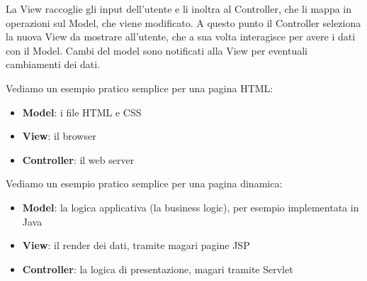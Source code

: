 \documentclass[a4paper,12pt, oneside]{book}
\begin{document}
La View raccoglie gli input dell'utente e li inoltra al Controller, che li mappa
in operazioni sul Model, che viene modificato. A questo punto il Controller
seleziona la nuova View da mostrare all'utente, che a sua volta interagisce per
avere i dati con il Model. Cambi del model sono notificati alla View per
eventuali cambiamenti dei dati.
\begin{esempio}
  Vediamo un esempio pratico semplice per una pagina HTML:
  \begin{itemize}
    \item \textbf{Model}: i file HTML e CSS
    \item \textbf{View}: il browser
    \item \textbf{Controller}: il web server
  \end{itemize}
\end{esempio}
\begin{esempio}
  Vediamo un esempio pratico semplice per una pagina dinamica:
  \begin{itemize}
    \item \textbf{Model}: la logica applicativa (la business logic), per esempio
    implementata in Java
    \item \textbf{View}: il render dei dati, tramite magari pagine JSP
    \item \textbf{Controller}: la logica di presentazione, magari tramite
    Servlet 
  \end{itemize}
\end{esempio}
\end{document}
